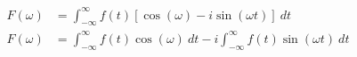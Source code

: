 \documentclass[preview]{standalone}
\begin{document}
\begin{align*}
F(\omega)&=\int_{-\infty}^{\infty}f(t)[\cos({\omega})-i\sin({\omega t})] \ dt \\ F(\omega)&=\int_{-\infty}^{\infty}f(t)\cos({\omega}) \ dt-i\int_{-\infty}^{\infty}f(t)\sin({\omega t}) \ dt
\end{align*}
\end{document}
